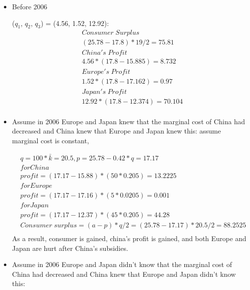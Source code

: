 \documentclass[a4paper]{article}
\begin{document}
    \begin{answer}[Shipbuilding (3)]
    \begin{itemize}
        \item Before 2006
        
        ($q_1$, $q_2$, $q_3$) = (4.56, 1.52, 12.92):
        \begin{align*}
            & Consumer \; Surplus \\
            & (25.78-17.8) * 19 / 2= 75.81 \\
            & China's \; Profit \\
            & 4.56 * (17.8-15.885) = 8.732 \\
            & Europe's \; Profit \\
            & 1.52 * (17.8 - 17.162) = 0.97 \\
            & Japan's \; Profit \\
            & 12.92 * (17.8 - 12.374) = 70.104 \\
        \end{align*}
        
        \item Assume in 2006 Europe and Japan knew that the marginal cost of China had decreased and China knew that Europe and Japan knew this:
        assume marginal cost is constant,
        
        \begin{align*}
        & q = 100*\bar{k} = 20.5, p = 25.78-0.42*q = 17.17 \\
        & for China \\
        & profit = (17.17-15.88)*(50*0.205) = 13.2225 \\  
        & for Europe \\ 
        & profit = (17.17-17.16)*(5*0.0205) = 0.001 \\  
        & for Japan \\
        & profit = (17.17-12.37)*(45*0.205) =44.28 \\   
        & Consumer \; surplus = (a-p)*q/2 = (25.78-17.17)*20.5/2 = 88.2525 \\
        \end{align*}
        As a result, consumer is gained, china's profit is gained, and both Europe and Japan are hurt after China's subsidies.
        
        \item Assume in 2006 Europe and Japan didn't know that the marginal cost of China had decreased and China knew that Europe and Japan didn't know this: 
        

\end{itemize}
\end{answer}
\end{document}
